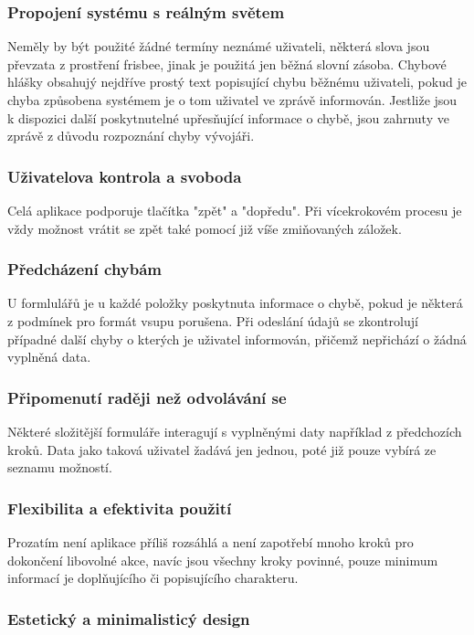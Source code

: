 \documentclass[thesis=B,czech]{FITthesis}[2012/06/26]
\begin{document}
	\subsubsection{Propojení systému s reálným světem}
	Neměly by být použité žádné termíny neznámé uživateli, některá slova jsou převzata z prostření frisbee, jinak je použitá jen běžná slovní zásoba. Chybové hlášky obsahujý nejdříve prostý text popisující chybu běžnému uživateli, pokud je chyba způsobena systémem je o tom uživatel ve zprávě informován. Jestliže jsou k dispozici další poskytnutelné upřesňující informace o chybě, jsou zahrnuty ve zprávě z důvodu rozpoznání chyby vývojáři.

	\subsubsection{Uživatelova kontrola a svoboda}
	Celá aplikace podporuje tlačítka "zpět" a "dopředu". Při vícekrokovém procesu je vždy možnost vrátit se zpět také pomocí již víše zmiňovaných záložek.

	\subsubsection{Předcházení chybám}
	U formlulářů je u každé položky poskytnuta informace o chybě, pokud je některá z podmínek pro formát vsupu porušena. Při odeslání údajů se zkontrolují případné další chyby o kterých je uživatel informován, přičemž nepřichází o žádná vyplněná data.

	\subsubsection{Připomenutí raději než odvolávání se}
	Některé složitější formuláře interagují s vyplněnými daty například z předchozích kroků. Data jako taková uživatel žadává jen jednou, poté již pouze vybírá ze seznamu možností.

	\subsubsection{Flexibilita a efektivita použití}
	Prozatím není aplikace příliš rozsáhlá a není zapotřebí mnoho kroků pro dokončení libovolné akce, navíc jsou všechny kroky povinné, pouze minimum informací je doplňujícího či popisujícího charakteru.

	\subsubsection{Estetický a minimalisticý design}
\end{document}
